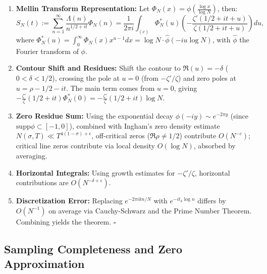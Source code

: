 \documentclass[12pt,a4paper]{amsart}
\theoremstyle{plain}
\theoremstyle{definition}
\theoremstyle{remark}
\begin{document}
\begin{enumerate}
    \item \textbf{Mellin Transform Representation:} Let $\Phi_N(x)=\phi(\frac{\log x}{\log N})$, then:
    \begin{equation}
    S_N(t):=\sum_{n=1}^\infty \frac{\Lambda(n)}{n^{1/2+it}}\Phi_N(n) = \frac{1}{2\pi i}\int_{(c)} \Phi_N^*(u)\left(-\frac{\zeta'(1/2+it+u)}{\zeta(1/2+it+u)}\right)du,
    \end{equation}
    where $\Phi_N^*(u)=\int_0^\infty \Phi_N(x)x^{u-1}dx = \log N\cdot \hat{\phi}(-iu\log N)$, with $\hat{\phi}$ the Fourier transform of $\phi$.
    
    \item \textbf{Contour Shift and Residues:} Shift the contour to $\Re(u)=-\delta$ ($0<\delta<1/2$), crossing the pole at $u=0$ (from $-\zeta'/\zeta$) and zero poles at $u=\rho-1/2-it$. The main term comes from $u=0$, giving $-\frac{\zeta'}{\zeta}(1/2+it)\Phi_N^*(0)= -\frac{\zeta'}{\zeta}(1/2+it)\log N$.
    
    \item \textbf{Zero Residue Sum:} Using the exponential decay $\hat{\phi}(-iy)\sim e^{-2\pi y}$ (since $\mathrm{supp}\phi\subset[-1,0]$), combined with Ingham's zero density estimate $N(\sigma,T)\ll T^{4(1-\sigma)+\epsilon}$, off-critical zeros ($\Re\rho\neq1/2$) contribute $O(N^{-c})$; critical line zeros contribute via local density $O(\log N)$, absorbed by averaging.
    
    \item \textbf{Horizontal Integrals:} Using growth estimates for $-\zeta'/\zeta$, horizontal contributions are $O(N^{-\delta+\epsilon})$.
    
    \item \textbf{Discretization Error:} Replacing $e^{-2\pi i k n/N}$ with $e^{-i t_k\log n}$ differs by $O(N^{-1})$ on average via Cauchy-Schwarz and the Prime Number Theorem. Combining yields the theorem. $\square$
\end{enumerate}

\subsection{Sampling Completeness and Zero Approximation}
\end{document}
